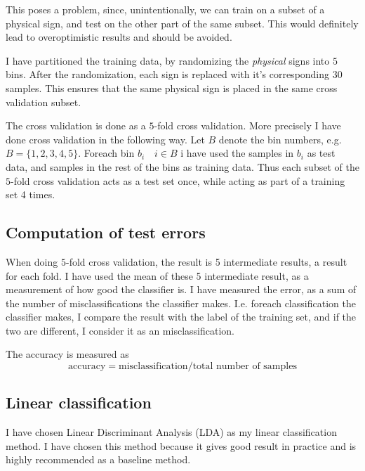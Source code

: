 \documentclass[10pt]{article}
\begin{document}
This poses a problem, since, unintentionally, we can train on a subset of a physical sign, and test on the other part of the same subset. This would definitely lead to overoptimistic results and should be avoided.

I have partitioned the training data, by randomizing the \emph{physical} signs into $5$ bins. After the randomization, each sign is replaced with it's corresponding $30$ samples. This ensures that the same physical sign is placed in the same cross validation subset.

The cross validation is done as a $5$-fold cross validation. More precisely I have done cross validation in the following way. Let $B$ denote the bin numbers, e.g. $B = \{1,2,3,4,5\}$. Foreach bin $b_i \quad i \in B$ i have used the samples in $b_i$ as test data, and samples in the rest of the bins as training data. Thus each subset of the $5$-fold cross validation acts as a test set once, while acting as part of a training set 4 times.

\subsection*{Computation of test errors} %
\label{sub:computation_of_test_errors}
When doing $5$-fold cross validation, the result is 5 intermediate results, a result for each fold. I have used the mean of these 5 intermediate result, as a measurement of how good the classifier is. I have measured the error, as a sum of the number of misclassifications the classifier makes. I.e. foreach classification the classifier makes, I compare the result with the label of the training set, and if the two are different, I consider it as an misclassification.

The accuracy is measured as 
\begin{equation}
  \text{accuracy} = \text{misclassification}/\text{total number of samples}
\end{equation}


\subsection*{Linear classification} %
\label{sub:linear_classification}
I have chosen Linear Discriminant Analysis (LDA) as my linear classification method. I have chosen this method because it gives good result in practice and is highly recommended as a baseline method\cite{LDAslides}. 
\end{document}
